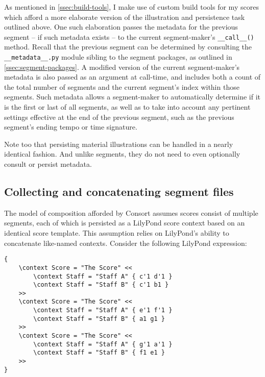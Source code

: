 As mentioned in \autoref{ssec:build-tools}, I make use of custom build tools
for my scores which afford a more elaborate version of the illustration and
persistence task outlined above. One such elaboration passes the metadata for
the previous segment -- if such metadata exists -- to the current
segment-maker's \texttt{\_\_call\_\_()} method. Recall that the previous
segment can be determined by consulting the \texttt{\_\_metadata\_\_.py} module
sibling to the segment packages, as outlined in
\autoref{ssec:segment-packages}. A modified version of the current
segment-maker's metadata is also passed as an argument at call-time, and
includes both a count of the total number of segments and the current segment's
index within those segments. Such metadata allows a segment-maker to
automatically determine if it is the first or last of all segments, as well as
to take into account any pertinent settings effective at the end of the
previous segment, such as the previous segment's ending tempo or time
signature.

Note too that persisting material illustrations can be handled in a nearly
identical fashion. And unlike segments, they do not need to even optionally
consult or persist metadata.

\subsection{Collecting and concatenating segment files}
\label{ssec:collecting-and-concatenating-segment-files}

The model of composition afforded by Consort assumes scores consist of multiple
segments, each of which is persisted as a LilyPond score context based on an
identical score template. This assumption relies on LilyPond's ability to
concatenate like-named contexts. Consider the following LilyPond expression:

\begin{singlespacing}
\vspace{-0.5\baselineskip}
\begin{verbatim}
{
    \context Score = "The Score" <<
        \context Staff = "Staff A" { c'1 d'1 }
        \context Staff = "Staff B" { c'1 b1 }
    >>
    \context Score = "The Score" <<
        \context Staff = "Staff A" { e'1 f'1 }
        \context Staff = "Staff B" { a1 g1 }
    >>
    \context Score = "The Score" <<
        \context Staff = "Staff A" { g'1 a'1 }
        \context Staff = "Staff B" { f1 e1 }
    >>
}
\end{verbatim}
\end{singlespacing}

